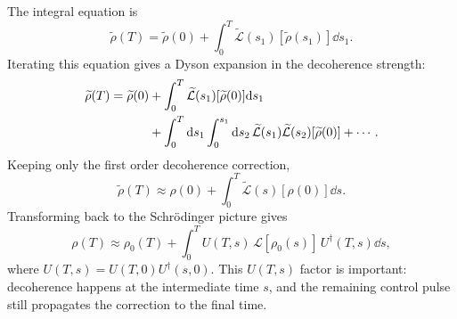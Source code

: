 \documentclass{simple-notes}
\begin{document}
The integral equation is
\begin{equation}
    \widetilde{\rho}(T)
    =
    \widetilde{\rho}(0)
    +
    \int_0^T
    \widetilde{\mathcal{L}}(s_1)[\widetilde{\rho}(s_1)]\dd s_1 .
\end{equation}
Iterating this equation gives a Dyson expansion in the decoherence strength:
\begin{align}
    \widetilde{\rho}(T)
    =
    \widetilde{\rho}(0)
    &+
    \int_0^T
    \widetilde{\mathcal{L}}(s_1)[\widetilde{\rho}(0)]\dd s_1
    \notag\\
    &+
    \int_0^T\dd s_1
    \int_0^{s_1}\dd s_2\,
    \widetilde{\mathcal{L}}(s_1)
    \widetilde{\mathcal{L}}(s_2)
    [\widetilde{\rho}(0)]
    + \cdots .
    \label{eq:lindblad_dyson_expansion}
\end{align}
Keeping only the first order decoherence correction,
\begin{equation}
    \widetilde{\rho}(T)
    \approx
    \rho(0)
    +
    \int_0^T
    \widetilde{\mathcal{L}}(s)[\rho(0)]\dd s .
\end{equation}
Transforming back to the Schr\"odinger picture gives
\begin{equation}
    \rho(T)
    \approx
    \rho_0(T)
    +
    \int_0^T
    U(T,s)\,
    \mathcal{L}[\rho_0(s)]\,
    U^\dagger(T,s)\dd s,
    \label{eq:first_order_lindblad_schrodinger}
\end{equation}
where $U(T,s)=U(T,0)U^\dagger(s,0)$. This $U(T,s)$ factor is important:
decoherence happens at the intermediate time $s$, and the remaining control
pulse still propagates the correction to the final time.
\end{document}
